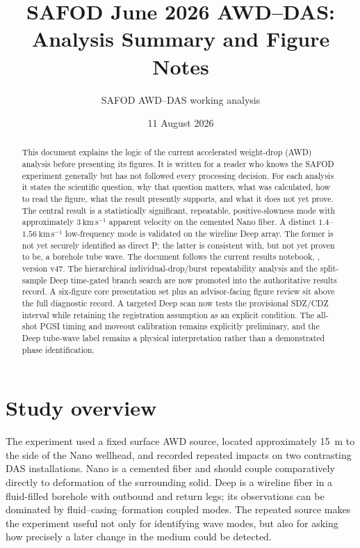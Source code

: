 \documentclass[11pt]{article}
\title{SAFOD June 2026 AWD--DAS: Analysis Summary and Figure Notes}
\author{SAFOD AWD--DAS working analysis}
\date{11 August 2026}
\begin{document}
\maketitle

\begin{abstract}
This document explains the logic of the current accelerated weight-drop (AWD)
analysis before presenting its figures.  It is written for a reader who knows
the SAFOD experiment generally but has not followed every processing decision.
For each analysis it states the scientific question, why that question matters,
what was calculated, how to read the figure, what the result presently supports,
and what it does not yet prove.  The central result is a statistically
significant, repeatable, positive-slowness mode with approximately
$3~\mathrm{km\,s^{-1}}$ apparent velocity on the cemented Nano fiber.  A distinct
$1.4$--$1.56~\mathrm{km\,s^{-1}}$ low-frequency mode is validated on the
wireline Deep array.  The former is not yet securely identified as direct P;
the latter is consistent with, but not yet proven to be, a borehole tube wave.
The document follows the current results notebook,
, version v47.  The hierarchical
individual-drop/burst repeatability analysis and the split-sample Deep
time-gated branch search are now promoted into the authoritative results
record.  A six-figure core presentation set plus an advisor-facing figure
review sit above the full diagnostic record.  A targeted Deep scan now tests
the provisional SDZ/CDZ interval while retaining the registration assumption
as an explicit condition.  The all-shot PGSI timing and moveout calibration
remains explicitly preliminary, and the Deep tube-wave label remains a
physical interpretation rather than a demonstrated phase identification.
\end{abstract}

\tableofcontents
\clearpage

\section{Study overview}

The experiment used a fixed surface AWD source, located approximately 15~m to
the side of the Nano wellhead, and recorded repeated impacts on two contrasting
DAS installations.  Nano is a cemented fiber and should couple comparatively
directly to deformation of the surrounding solid.  Deep is a wireline fiber in
a fluid-filled borehole with outbound and return legs; its observations can be
dominated by fluid--casing--formation coupled modes.  The repeated source makes
the experiment useful not only for identifying wave modes, but also for asking
how precisely a later change in the medium could be detected.
\end{document}
